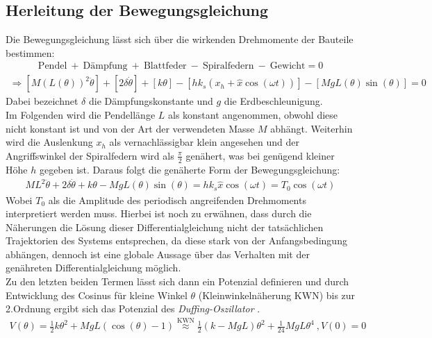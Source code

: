 \subsection{Herleitung der Bewegungsgleichung}
\label{sub:bewegungsgleichung}
Die Bewegungsgleichung lässt sich über die wirkenden Drehmomente der Bauteile bestimmen:
\begin{gather*}
        \text{Pendel}~+~\text{Dämpfung}~+~\text{Blattfeder}~-~\text{Spiralfedern}~-~\text{Gewicht} = 0
\end{gather*}
\begin{gather}
    \Rightarrow [M(L(\theta))^2\ddot{\theta}]+[2\delta\dot{\theta}]+[k\theta]-[hk_s(x_h+\hat{x}\cos(\omega t))]-[MgL(\theta)\sin(\theta)]=0
\end{gather}
Dabei bezeichnet $\delta$ die Dämpfungskonstante und $g$ die Erdbeschleunigung.\\
Im Folgenden wird die Pendellänge $L$ als konstant angenommen, obwohl diese nicht konstant ist und von der Art der verwendeten Masse $M$ abhängt. Weiterhin wird die Auslenkung $x_h$ als vernachlässigbar klein angesehen und der Angriffswinkel der Spiralfedern wird als $\frac{\pi}{2}$ genähert, was bei genügend kleiner Höhe $h$ gegeben ist.
Daraus folgt die genäherte Form der Bewegungsgleichung:
\begin{gather}
    ML^2\ddot{\theta}+2\delta\dot{\theta}+k\theta-MgL(\theta)\sin(\theta)=hk_s\hat{x}\cos(\omega t)=T_0\cos(\omega t)
\end{gather}
Wobei $T_0$ als die Amplitude des periodisch angreifenden Drehmoments interpretiert werden muss. Hierbei ist noch zu erwähnen, dass durch die Näherungen die Lösung dieser Differentialgleichung nicht der tatsächlichen Trajektorien des Systems entsprechen, da diese stark von der Anfangsbedingung abhängen, dennoch ist eine globale Aussage über das Verhalten mit der genähreten Differentialgleichung möglich.\\
Zu den letzten beiden Termen lässt sich dann ein Potenzial definieren und durch Entwicklung des Cosinus für kleine Winkel $\theta$ (Kleinwinkelnäherung KWN) bis zur 2.Ordnung ergibt sich das Potenzial des \textit{Duffing-Oszillator} \citep{Lueck}.
\begin{gather}
    V(\theta) = \frac{1}{2}k\theta^2 + MgL(\cos(\theta)-1)\overset{\text{KWN}}{\approx}\frac{1}{2}(k-MgL)\theta^2 + \frac{1}{24}MgL\theta^4~,V(0)=0
\end{gather}

